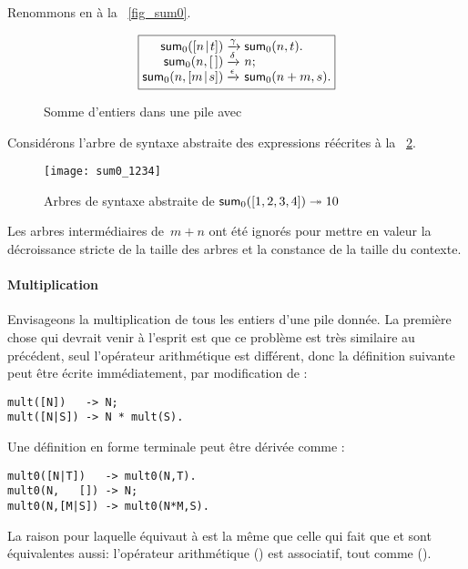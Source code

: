 Renommons  en  à la
\fig~\vref{fig_sum0}.
\begin{figure}[b]
\begin{equation*}
\boxed{%
\begin{array}{@{}r@{\;}l@{\;}l@{}}
\fun{sum}_0(\cons{n}{t}) & \xrightarrow{\smash{\gamma}} 
                         & \fun{sum}_0(n,t).\\
      \fun{sum}_0(n,\el) & \xrightarrow{\smash{\delta}} & n;\\
\fun{sum}_0(n,\cons{m}{s}) & \xrightarrow{\smash{\epsilon}}
                           & \fun{sum}_0(n+m,s).
\end{array}}
\end{equation*}
\caption{Somme d'entiers dans une pile avec 
\label{fig_sum0}}
\end{figure} 
Considérons l'arbre de syntaxe abstraite des expressions réécrites à
la \fig~\ref{fig_sum0_1234}.
\begin{figure}
\centering
\texttt{[image: sum0\_1234]}
\caption{Arbres de syntaxe abstraite de \(\textsf{sum}_0([1,2,3,4])
  \twoheadrightarrow 10\)\label{fig_sum0_1234}}
\end{figure}
Les arbres intermédiaires de~\(m+n\) ont été ignorés pour mettre en
valeur la décroissance stricte de la taille des arbres et la constance
de la taille du contexte.

\paragraph{Multiplication}

Envisageons la multiplication de tous les entiers d'une pile
donnée. La première chose qui devrait venir à l'esprit est que ce
problème est très similaire au précédent, seul l'opérateur
arithmétique est différent, donc la définition suivante peut être
écrite immédiatement, par modification de :
\begin{verbatim}
mult([N])   -> N;
mult([N|S]) -> N * mult(S).
\end{verbatim}
Une définition en forme terminale peut être dérivée comme
:
\begin{verbatim}
mult0([N|T])   -> mult0(N,T).
mult0(N,   []) -> N;
mult0(N,[M|S]) -> mult0(N*M,S).
\end{verbatim}
La raison pour laquelle  équivaut à 
est la même que celle qui fait que  et 
sont équivalentes aussi: l'opérateur arithmétique (\erlcode{*}) est
associatif, tout comme (\erlcode{+}).

